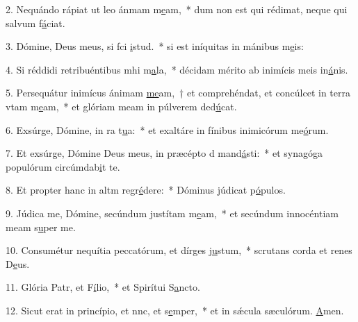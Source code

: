 2. Nequándo rápiat ut leo ánmam m\uline{e}am,~* dum non est qui rédimat, neque qui salvum f\uline{á}ciat.\par 
3. Dómine, Deus meus, si fci \uline{i}stud.~* si est iníquitas in mánibus m\uline{e}is:\par 
4. Si réddidi retribuéntibus mhi m\uline{a}la,~* décidam mérito ab inimícis meis in\uline{á}nis.\par 
5. Persequátur inimícus ánimam \uline{me}am,~† et comprehéndat, et concúlcet in terra vtam m\uline{e}am,~* et glóriam meam in púlverem ded\uline{ú}cat.\par 
6. Exsúrge, Dómine, in ra t\uline{u}a:~* et exaltáre in fínibus inimicórum me\uline{ó}rum.\par 
7. Et exsúrge, Dómine Deus meus, in præcépto d mand\uline{á}sti:~* et synagóga populórum circúmdab\uline{i}t te.\par 
8. Et propter hanc in altm regr\uline{é}dere:~* Dóminus júdicat p\uline{ó}pulos.\par 
9. Júdica me, Dómine, secúndum justítam m\uline{e}am,~* et secúndum innocéntiam meam s\uline{u}per me.\par 
10. Consumétur nequítia peccatórum, et dírges j\uline{u}stum,~* scrutans corda et renes D\uline{e}us.\par 
11. Glória Patr, et F\uline{í}lio,~* et Spirítui S\uline{a}ncto.\par 
12. Sicut erat in princípio, et nnc, et s\uline{e}mper,~* et in sǽcula sæculórum. \uline{A}men.\par 
